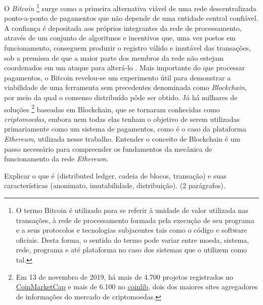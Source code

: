 \documentclass[a4paper,11pt]{article}
\newcommand{\link}[2]{{\color{blue}\underline{\href{#1}{#2}}}}
\begin{document}
O \emph{Bitcoin}
\footnote{O termo Bitcoin é utilizado para se referir à unidade de valor utilizada nas transações, à rede de processamento formada pela execução de seu programa e a seus protocolos e tecnologias subjacentes tais como o código e software oficiais.
Desta forma, o sentido do termo pode variar entre moeda, sistema, rede, programa e até plataforma no caso dos sistemas que o utilizem como tal.}
surge como a primeira alternativa viável de uma rede descentralizada ponto-a-ponto de pagamentos que não depende de uma entidade central confiável.
A confiança é depositada aos próprios integrantes da rede de processamento, através de um conjunto de algoritmos e incentivos que, uma vez postos em funcionamento, conseguem produzir o registro válido e imutável das transações, sob a premissa de que a maior parte dos membros da rede não estejam coordenados em um ataque para alterá-lo \cite{nakamoto2008bitcoin}.
Mais importante do que processar pagamentos, o Bitcoin revelou-se um experimento útil para demonstrar a viabilidade de uma ferramenta sem precedentes denominada como \emph{Blockchain}, por meio da qual o consenso distribuído pôde ser obtido.
Já há milhares de soluções
\footnote{Em 13 de novembro de 2019, há mais de 4.700 projetos registrados no \link{https://coinmarketcap.com/}{CoinMarketCap} e mais de 6.100 no \link{https://coinlib.io/}{coinlib}, dois dos maiores sites agregadores de informações do mercado de criptomoedas.}
baseadas em Blockchain, que se tornaram conhecidas como \emph{criptomoedas}, embora nem todas elas tenham o objetivo de serem utilizadas primariamente como um sistema de pagamentos, como é o caso da plataforma \emph{Ethereum}, utilizada nesse trabalho.
Entender o conceito de Blockchain é um passo necessário para compreender os fundamentos da mecânica de funcionamento da rede \emph{Ethereum}.

{\color{ForestGreen}Explicar o que é (distributed ledger, cadeia de blocos, transação) e suas características (anonimato, imutabilidade, distribuição). (2 parágrafos).}
\end{document}
